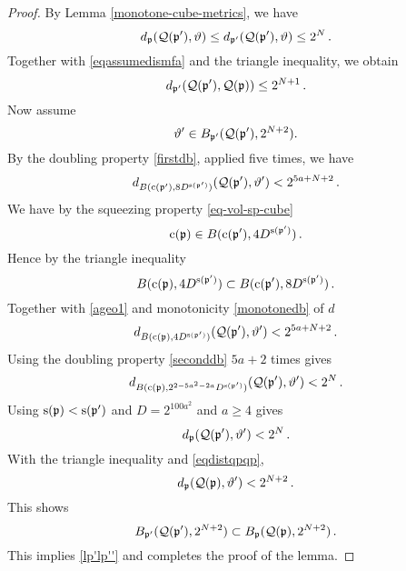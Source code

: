 {\begin{proof}
By Lemma \ref{monotone-cube-metrics}, we have
\begin{equation}
     d_{{\mathfrak p}}({\mathcal{Q}}({\mathfrak p}'),{\vartheta})
     \le d_{{\mathfrak p}'}({\mathcal{Q}}({\mathfrak p}'),{\vartheta})
     \le  2^{N} \, .
\end{equation}
Together with \eqref{eqassumedismfa} and the triangle inequality, we obtain
\begin{equation}\label{eqdistqpqp}
    d_{{\mathfrak p}'}({\mathcal{Q}}({\mathfrak p}'),{\mathcal{Q}}({\mathfrak p}))\le 2^{N+1}  \, .
\end{equation}
Now assume
\begin{equation}
    {\vartheta}'\in B_{{\mathfrak p}'}({\mathcal{Q}}({\mathfrak p}'),2^{N+2}).
\end{equation}
By the doubling property \eqref{firstdb}, applied five times, we have
\begin{equation}\label{ageo1}    d_{B({\mathrm{c}}({\mathfrak p}'),8D^{{\mathrm{s}}({\mathfrak p}')})}({\mathcal{Q}}({\mathfrak p}'),{\vartheta}') < 2^{5a+N+2}\, .
\end{equation}
We have by the squeezing property \eqref{eq-vol-sp-cube}
\begin{equation}
 {\mathrm{c}}({\mathfrak p})\in
B({\mathrm{c}}({\mathfrak p}'),4D^{{\mathrm{s}}({\mathfrak p}')})\, .
\end{equation}
Hence by the triangle inequality
\begin{equation}
 B({\mathrm{c}}({\mathfrak p}), 4D^{{\mathrm{s}}({\mathfrak p}')})
 \subset
B({\mathrm{c}}({\mathfrak p}'),8D^{{\mathrm{s}}({\mathfrak p}')})\, .
\end{equation}
Together with \eqref{ageo1} and  monotonicity \eqref{monotonedb} of $d$
\begin{equation}
    d_{B({\mathrm{c}}({\mathfrak p}),4D^{{\mathrm{s}}({\mathfrak p}')})}({\mathcal{Q}}({\mathfrak p}'),{\vartheta}') < 2^{5a+N+2}\, .
\end{equation}
Using the doubling property \eqref{seconddb} $5a+2$ times  gives
\begin{equation}
    d_{B({\mathrm{c}}({\mathfrak p}),2^{2-5a^2-2a}D^{{\mathrm{s}}({\mathfrak p}')})}({\mathcal{Q}}({\mathfrak p}'),{\vartheta}') < 2^{N}\, .
\end{equation}
Using ${\mathrm{s}}({\mathfrak p})<{\mathrm{s}}({\mathfrak p}')$ and $D=2^{100a^2}$ and $a\ge 4$ gives
\begin{equation}
    d_{{\mathfrak p}}({\mathcal{Q}}({\mathfrak p}'),{\vartheta}') < 2^{N}\, .
\end{equation}
With the triangle inequality and \eqref{eqdistqpqp},
\begin{equation}
    d_{{\mathfrak p}}({\mathcal{Q}}({\mathfrak p}),{\vartheta}') < 2^{N+2}\, .
\end{equation}
This shows
\begin{equation}
B_{{\mathfrak p}'}({\mathcal{Q}}({\mathfrak p}'),2^{N+2})\subset    B_{{\mathfrak p}}({\mathcal{Q}}({\mathfrak p}),2^{N+2})\, .
\end{equation}
This implies  \eqref{lp'lp''} and completes the proof of the lemma.
\end{proof}

}
